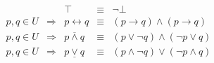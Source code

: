 \documentclass{standalone}
\begin{document}
$
\begin{array}{rcrcl}
          &                 & \top                & \equiv & \lnot\bot                                                     \\
p,q\in{}U & \Longrightarrow & p\leftrightarrow{}q & \equiv & \left(p\rightarrow{}q\right)\land\left(p\rightarrow{}q\right) \\
p,q\in{}U & \Longrightarrow & p\overline{\land}q  & \equiv & \left(p\lor\lnot{}q\right)\land\left(\lnot{}p\lor{}q\right)   \\
p,q\in{}U & \Longrightarrow & p\underline{\lor}q  & \equiv & \left(p\land\lnot{}q\right)\lor\left(\lnot{}p\land{}q\right)  \\
\end{array}
$
\end{document}
